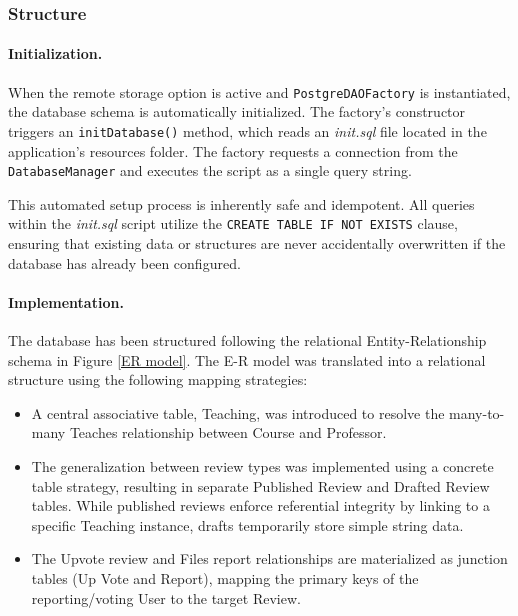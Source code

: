 \subsubsection{Structure}
\paragraph{Initialization.}
When the remote storage option is active and \texttt{PostgreDAOFactory} is instantiated, the database schema is automatically initialized. The factory's constructor triggers an \texttt{initDatabase()} method, which reads an \textit{init.sql} file located in the application's resources folder. The factory requests a connection from the \texttt{DatabaseManager} and executes the script as a single query string.

This automated setup process is inherently safe and idempotent. All queries within the \textit{init.sql} script utilize the \texttt{CREATE TABLE IF NOT EXISTS} clause, ensuring that existing data or structures are never accidentally overwritten if the database has already been configured. 

\paragraph{Implementation.}
The database has been structured following the relational Entity-Relationship schema in Figure \ref{ER model}. The E-R model was translated into a relational structure using the following mapping strategies:
\begin{itemize}
	\item A central associative table, Teaching, was introduced to resolve the many-to-many Teaches relationship between Course and Professor.
	\item The generalization between review types was implemented using a concrete table strategy, resulting in separate Published Review and Drafted Review tables. While published reviews enforce referential integrity by linking to a specific Teaching instance, drafts temporarily store simple string data.
	\item The Upvote review and Files report relationships are materialized as junction tables (Up Vote and Report), mapping the primary keys of the reporting/voting User to the target Review.
\end{itemize}

